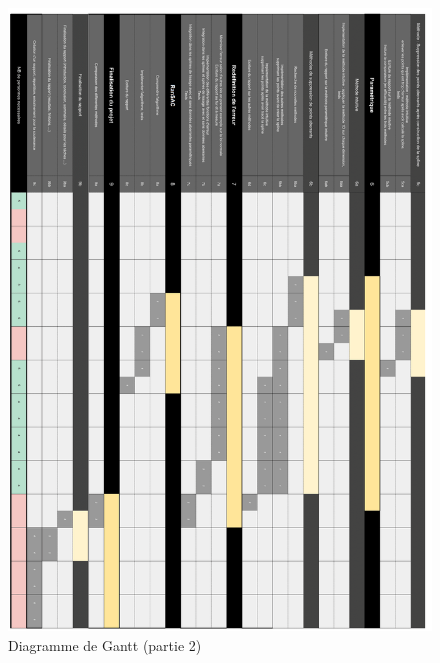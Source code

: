 \documentclass[a4paper,10pt]{article} %
\begin{document}
\begin{figure}
\begin{center}
\includegraphics[width=16cm]{p2.png} 
\end{center}
\caption{Diagramme de Gantt (partie 2)}
\label{DiagG2}
\end{figure}
\end{document}
